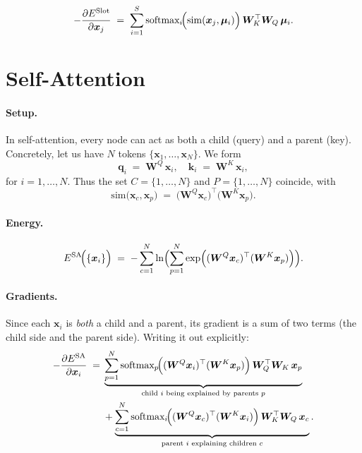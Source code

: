 \documentclass{article}
\begin{document}
\begin{equation}
-\frac{\partial E^{\mathrm{Slot}}}{\partial \bm{x}_j}
\;=\;
\sum_{i=1}^S
\text{softmax}_{i}\!\Bigl(\mathrm{sim}(\bm{x}_j,\bm{\mu}_i)\Bigr)\,
\bm{W}_K^\top \bm{W}_Q\,\bm{\mu}_i.
\end{equation}

\section{Self-Attention}

\paragraph{Setup.}
In self-attention, every node can act as both a child (query) and a parent (key). Concretely, let us have \(N\) tokens \(\{\bm{x}_1,\dots,\bm{x}_N\}\).  We form
\[
\bm{q}_i \;=\; \bm{W}^Q\,\bm{x}_i,
\quad
\bm{k}_i \;=\; \bm{W}^K\,\bm{x}_i,
\]
for \(i = 1,\ldots,N\).  
Thus the set \(C = \{1,\ldots,N\}\) and \(P = \{1,\ldots,N\}\) coincide, with
\[
\mathrm{sim}\bigl(\bm{x}_c,\bm{x}_p\bigr)
\;=\;
\bigl(\bm{W}^Q \bm{x}_c\bigr)^\top
\bigl(\bm{W}^K \bm{x}_p\bigr).
\]

\paragraph{Energy.}
\begin{equation}
E^{\mathrm{SA}}\!\Bigl(\{\bm{x}_i\}\Bigr)
\;=\;
-\sum_{c=1}^N
\ln \Bigl(\sum_{p=1}^N
\exp \Bigl(
(\bm{W}^Q \bm{x}_c)^\top
(\bm{W}^K \bm{x}_p)
\Bigr)\Bigr).
\end{equation}

\paragraph{Gradients.}
Since each \(\bm{x}_i\) is \emph{both} a child and a parent, its gradient is a sum of two terms (the child side and the parent side).  Writing it out explicitly:
\begin{equation}
    \begin{aligned}
    -\frac{\partial E^{\mathrm{SA}}}{\partial \bm{x}_i}
    \;=\;&
    \underbrace{
    \sum_{p=1}^N
    \text{softmax}_{p}\!\Bigl(
    (\bm{W}^Q \bm{x}_i)^\top
    (\bm{W}^K \bm{x}_p)
    \Bigr)\,
    \bm{W}_Q^\top \bm{W}_K \,\bm{x}_p
    }_{\text{child $i$ being explained by parents $p$}} \\
    &+
    \underbrace{
    \sum_{c=1}^N
    \text{softmax}_{i}\!\Bigl(
    (\bm{W}^Q \bm{x}_c)^\top
    (\bm{W}^K \bm{x}_i)
    \Bigr)\,
    \bm{W}_K^\top \bm{W}_Q \,\bm{x}_c
    }_{\text{parent $i$ explaining children $c$}}.
    \end{aligned}
    \end{equation}
\end{document}

